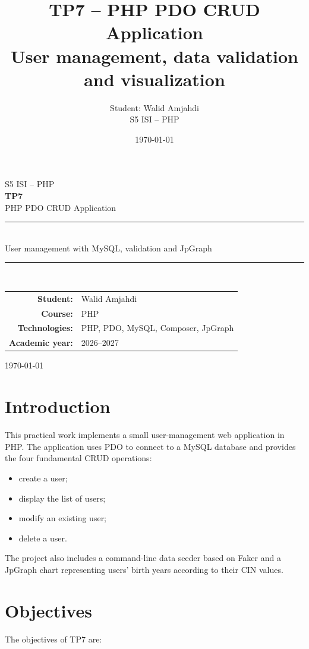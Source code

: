 \documentclass[12pt,a4paper]{article}
\title{\textbf{TP7 -- PHP PDO CRUD Application}\\
\large User management, data validation and visualization}
\author{Student: Walid Amjahdi\\[0.2cm]S5 ISI -- PHP}
\date{\today}
\begin{document}
\begin{titlepage}
    \centering
    \vspace*{2cm}
    {\Large\textsc{S5 ISI -- PHP}}\\[1.2cm]
    {\Huge\bfseries TP7}\\[0.5cm]
    {\LARGE PHP PDO CRUD Application}\\[1.5cm]
    \rule{\textwidth}{0.5pt}\\[0.5cm]
    {\large User management with MySQL, validation and JpGraph}\\[0.5cm]
    \rule{\textwidth}{0.5pt}\\[2cm]
    \begin{tabular}{>{\bfseries}rl}
        Student: & Walid Amjahdi\\
        Course: & PHP\\
        Technologies: & PHP, PDO, MySQL, Composer, JpGraph\\
        Academic year: & 2026--2027
    \end{tabular}
    \vfill
    {\large \today}
\end{titlepage}

\tableofcontents
\newpage

\section{Introduction}

This practical work implements a small user-management web application in PHP.
The application uses PDO to connect to a MySQL database and provides the four
fundamental CRUD operations:

\begin{itemize}[nosep]
    \item create a user;
    \item display the list of users;
    \item modify an existing user;
    \item delete a user.
\end{itemize}

The project also includes a command-line data seeder based on Faker and a
JpGraph chart representing users' birth years according to their CIN values.

\section{Objectives}

The objectives of TP7 are:
\end{document}
